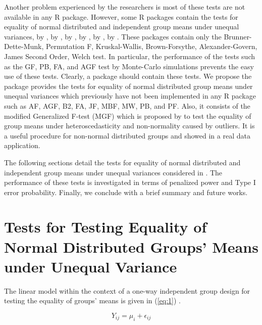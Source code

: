 Another problem experienced by the researchers is most of these tests are not available in any R package. However, some R packages contain the tests for equality of normal distributed and independent group means under unequal variances,  by \cite{aho:2019},  by \cite{hothorn:2008},  by \cite{hui:2008},  by \cite{dag:2018},  by \cite{villacorta:2017},  by \cite{wilcox:2018}. These packages contain only the Brunner-Dette-Munk, Permutation F, Kruskal-Wallis, Brown-Forsythe, Alexander-Govern, James Second Order, Welch test. In particular, the performance of the tests such as the GF, PB, FA, and AGF test by Monte-Carlo simulations prevents the easy use of these tests. Clearly, a package should contain these tests. We propose the package  provides the tests for equality of normal distributed group means under unequal variances which previously have not been implemented in any R package such as AF, AGF, B2, FA, JF, MBF, MW, PB, and PF. Also, it consists of the modified Generalized F-test (MGF) which is proposed by \cite{cavus:2017} to test the equality of group means under heteroscedasticity and non-normality caused by outliers. It is a useful procedure for non-normal distributed groups and \cite{cavus:2018} showed in a real data application.

The following sections detail the tests for equality of normal distributed and independent group means under unequal variances considered in . The performance of these tests is investigated in terms of penalized power and Type I error probability. Finally, we conclude with a brief summary and future works.

\section{Tests for Testing Equality of Normal Distributed Groups' Means under Unequal Variance }

The linear model within the context of a one-way independent group design for testing the equality of groups' means is given in (\ref{eq:1}) .

\begin{equation}
Y_{ij}=\mu_i+\epsilon_{ij}  \label{eq:1}
\end{equation}

